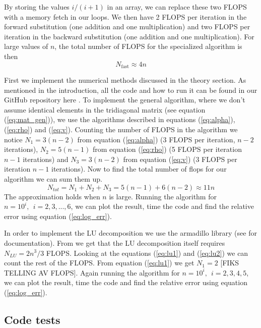 \documentclass[reprint, english,notitlepage]{revtex4-1}  %
\begin{document}
By storing the values $i/(i+1)$ in an array, we can replace these two FLOPS with a memory fetch in our loops. We then have 2 FLOPS per iteration in the forward substitution (one addition and one multiplication) and two FLOPS per iteration in the backward substitution (one addition and one multiplication). For large values of $n$, the total number of FLOPS for the specialized algorithm is then
\begin{equation}
  \label{eq:flops_specialized}
  N_{\text{fast}} \approx 4n
\end{equation}

First we implement the numerical methods discussed in the theory section. As mentioned in the introduction, all the code and how to run it can be found in our GitHub repository here \citep{github}. To implement the general algorithm, where we don't assume identical elements in the tridiagonal matrix (see equation (\ref{eq:mat_gen})), we use the algorithms described in equations (\ref{eq:alpha}), (\ref{eq:rho}) and (\ref{eq:v}). Counting the number of FLOPS in the algorithm we notice $N_1 = 3(n-2)$ from equation (\ref{eq:alpha}) (3 FLOPS per iteration, $n-2$ iterations), $N_2 = 5(n-1)$ from equation (\ref{eq:rho}) (5 FLOPS per iteration $n-1$ iterations) and $N_3 = 3(n-2)$ from equation (\ref{eq:v}) (3 FLOPS per iteration $n-1$ iterations). Now to find the total number of flops for our algorithm we can sum them up.
\begin{equation*}
	N_{tot} = N_1+N_2+N_3 = 5(n-1) + 6(n-2) \approx 11n
\end{equation*}
The approximation holds when $n$ is large. Running the algorithm for $n=10^i,\ \ i = 2, 3, ..., 6$, we can plot the result, time the code and find the relative error using equation (\ref{eq:log_err}).

In order to implement the LU decomposition we use the armadillo library (see \citep{armadillo} for documentation). From \citep{lu_wiki} we get that the LU decomposition itself requires $N_{LU} = 2n^3/3$ FLOPS. Looking at the equations (\ref{eq:lu1}) and (\ref{eq:lu2}) we can count the rest of the FLOPS. From equation (\ref{eq:lu1}) we get $N_1 = 2$ [FIKS TELLING AV FLOPS]. Again running the algorithm for $n=10^i,\ \ i = 2, 3, 4, 5$, we can plot the result, time the code and find the relative error using equation (\ref{eq:log_err}).


\subsection{Code tests}
\end{document}
